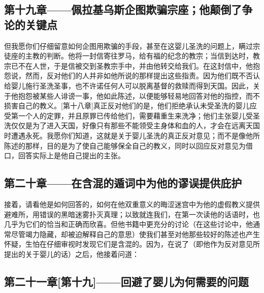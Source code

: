 \subsection{第十九章——佩拉基乌斯企图欺骗宗座；他颠倒了争论的关键点}

但我愿你们仔细留意如何企图用欺骗的手段，甚至在这婴儿圣洗的问题上，瞒过宗徒座的主教的判断。他将一封信寄往罗马，给有福的纪念的教宗；当信到达时，教宗已不在人世，于是信被交到圣教宗手中，并由他转交给我们。在这封信中，他抱怨说，然而，反对他们的人并非如他所说的那样提出这些指责。因为他们既不否认给婴儿施行圣洗圣事，也不许诺任何人可以脱离基督的救赎而得到天国。因此，关于他抱怨被某些人诽谤一事，他如此陈述，以便能够轻易地回答对他的指控，而不损害自己的教义。[第十八章]真正反对他们的是，他们拒绝承认未受圣洗的婴儿应受第一个人的定罪，并且原罪已传给他们，需要藉重生来洗净；他们主张婴儿受圣洗仅仅是为了进入天国，好像只有那些不能领受主身体和血的人，才会在远离天国时遭遇永死。我愿你们知道，这就是关于婴儿圣洗的真正反对意见；而不是像他所陈述的那样，目的是为了使自己能够保全自己的教义，同时以回应反对意见为借口，回答实际上是他自己提出的主张。\par


\subsection{第二十章——在含混的遁词中为他的谬误提供庇护}

接着，请看他是如何回答的，如何在他双重意义的晦涩迷宫中为他的虚假教义提供避难所，用错误的黑暗迷雾扑灭真理；以致就连我们，在第一次读他的话语时，也几乎为它们的恰当和正确而欣喜。但他书籍中更充分的讨论（在这些讨论中，他通常尽管竭力隐藏，却被迫解释自己的意思）使我们甚至对他那些较好的陈述也产生怀疑，生怕在仔细审视时发现它们是含混的。因为，在说了（即他作为反对意见所提出的关于婴儿的话）之后，他接着问道：\par


\subsection{第二十一章[第十九]——回避了婴儿为何需要的问题}

